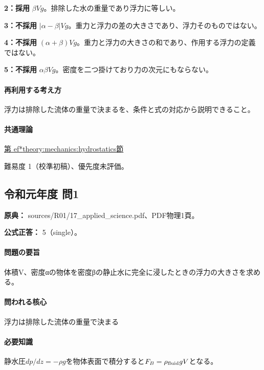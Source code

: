 \noindent\textbf{2：採用} \(\beta Vg\)。排除した水の重量であり浮力に等しい。\par

\noindent\textbf{3：不採用} \(|\alpha-\beta|Vg\)。重力と浮力の差の大きさであり、浮力そのものではない。\par

\noindent\textbf{4：不採用} \((\alpha+\beta)Vg\)。重力と浮力の大きさの和であり、作用する浮力の定義ではない。\par

\noindent\textbf{5：不採用} \(\alpha\beta Vg\)。密度を二つ掛けており力の次元にもならない。\par

\paragraph{再利用する考え方} 浮力は排除した流体の重量で決まるを、条件と式の対応から説明できること。

\paragraph{共通理論} \hyperref[theory:mechanics:hydrostatics]{第
ef*{theory:mechanics:hydrostatics}節}

\par 難易度 1（校準初稿）、優先度未評価。

\subsection{令和元年度 問1}
\label{q:r01-reg-applied-01}

\noindent\textbf{原典：} sources/R01/17\_applied\_science.pdf、PDF物理1頁。

\textbf{公式正答：} 5（single）。

\paragraph{問題の要旨} 体積V、密度αの物体を密度βの静止水に完全に浸したときの浮力の大きさを求める。

\paragraph{問われる核心} 浮力は排除した流体の重量で決まる

\paragraph{必要知識} 静水圧\(dp/dz=-\rho g\)を物体表面で積分すると\(F_B=\rho_{\rm fluid}gV\)となる。

